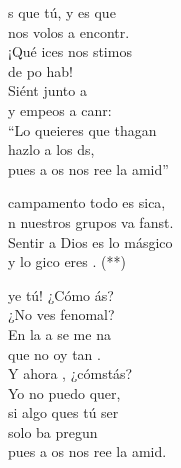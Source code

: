 \begin{cancion}%
	s que tú, y es que \\
	nos volos a encontr.\\
	¡Qué ices nos stimos\\
	de po hab!\\
	Siént junto a\\
	y empeos a canr:\\
	“Lo queieres que thagan\\
	hazlo  a los ds,\\
	pues a os nos ree la amid”\jump\\
	\begin{chorus}%
		campamento todo es sica,\\
		n nuestros grupos va fanst. \\
		Sentir a Dios es lo másgico\\
		y lo gico eres . (**)\jump\\
	\end{chorus}%
	ye tú! ¿Cómo ás?\\
	¿No ves fenomal?\\
	En la a se me na\\
	que no oy tan .\\
	Y ahora , ¿cómstás?\\
	Yo no puedo quer,\\
	si algo ques tú ser\\
	solo ba pregun \\
	pues a os nos ree la amid.\\
\end{cancion}%
